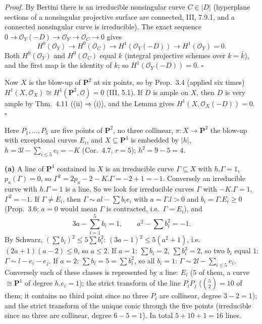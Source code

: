 \documentclass[11pt]{article}
\begin{document}
\emph{Proof.} By Bertini there is an irreducible nonsingular curve $C\in|D|$ (hyperplane sections of a nonsingular projective surface are connected, III, 7.9.1, and a connected nonsingular curve is irreducible). The exact sequence $0\to\mathcal O_Y(-D)\to\mathcal O_Y\to\mathcal O_C\to0$ gives
\[
H^0(\mathcal O_Y)\to H^0(\mathcal O_C)\to H^1(\mathcal O_Y(-D))\to H^1(\mathcal O_Y)=0 .
\]
Both $H^0(\mathcal O_Y)$ and $H^0(\mathcal O_C)$ equal $k$ (integral projective schemes over $k=\bar k$), and the first map is the identity of $k$; so $H^1(\mathcal O_Y(-D))=0$. \hfill$\square$

Now $X$ is the blow-up of $\mathbf P^2$ at six points, so by Prop.~3.4 (applied six times) $H^1(X,\mathcal O_X)\cong H^1(\mathbf P^2,\mathcal O)=0$ (III, 5.1). If $D$ is ample on $X$, then $D$ is very ample by Thm.~4.11 ((ii)$\Rightarrow$(i)), and the Lemma gives $H^1(X,\mathcal O_X(-D))=0$. \hfill$\square$

\pf
Here $P_1,\dots,P_5$ are five points of $\mathbf P^2$, no three collinear, $\pi:X\to\mathbf P^2$ the blow-up with exceptional curves $E_i$, and $X\subseteq\mathbf P^4$ is embedded by $|h|$, $h=3l-\sum_{i\le5}e_i=-K$ (Cor.~4.7, $r=5$); $h^2=9-5=4$.

\textbf{(a)} A line of $\mathbf P^4$ contained in $X$ is an irreducible curve $\Gamma\subseteq X$ with $h.\Gamma=1$, $p_a(\Gamma)=0$, so $\Gamma^2=2p_a-2-K.\Gamma=-2+1=-1$. Conversely an irreducible curve with $h.\Gamma=1$ is a line. So we look for irreducible curves $\Gamma$ with $-K.\Gamma=1$, $\Gamma^2=-1$. If $\Gamma\ne E_i$, then $\Gamma\sim al-\sum b_ie_i$ with $a=\Gamma.l>0$ and $b_i=\Gamma.E_i\ge0$ (Prop.~3.6; $a=0$ would mean $\Gamma$ is contracted, i.e.\ $\Gamma=E_i$), and
\[
3a-\sum_{i=1}^5b_i=1,\qquad a^2-\sum b_i^2=-1 .
\]
By Schwarz, $(\sum b_i)^2\le5\sum b_i^2$: $(3a-1)^2\le5(a^2+1)$, i.e.\ $(2a+1)(a-2)\le0$, so $a\le2$. If $a=1$: $\sum b_i=2$, $\sum b_i^2=2$, so two $b_i$ equal $1$: $\Gamma\sim l-e_i-e_j$. If $a=2$: $\sum b_i=5=\sum b_i^2$, so all $b_i=1$: $\Gamma\sim2l-\sum_{i\le 5}e_i$. Conversely each of these classes is represented by a line: $E_i$ ($5$ of them, a curve $\cong\mathbf P^1$ of degree $h.e_i=1$); the strict transform of the line $P_iP_j$ ($\binom52=10$ of them; it contains no third point since no three $P_i$ are collinear, degree $3-2=1$); and the strict transform of the unique conic through the five points (irreducible since no three are collinear, degree $6-5=1$). In total $5+10+1=16$ lines.
\end{document}
